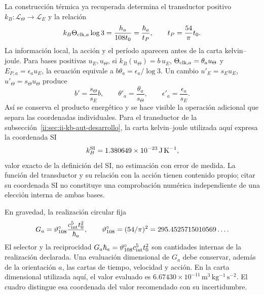 La construcción térmica ya recuperada determina el transductor positivo
\(k_B:\mathcal L_\Theta\to\mathcal L_E\) y la relación
\begin{equation}
 k_B\Theta_{{\rm clk},a}\log3
 =\frac{h_a}{108t_0}=\frac{\hbar_a}{t_P},
 \qquad t_P=\frac{54}{\pi}t_0.
 \label{ii:eq:ii-kb-comparacion}
\end{equation}
La información local, la acción y el período aparecen antes de la carta
kelvin--joule. Para bases positivas \(u_E,u_\Theta\), si
\(k_B(u_\Theta)=b\,u_E\),
\(\Theta_{{\rm clk},a}=\theta_a u_\Theta\) y
\(E_{P,a}=\epsilon_a u_E\), la ecuación equivale a
\(b\theta_a=\epsilon_a/\log3\). Un cambio
\(u'_E=s_Eu_E\), \(u'_\Theta=s_\Theta u_\Theta\) produce
\[
 b'=\frac{s_\Theta}{s_E}b,\qquad
 \theta'_a=\frac{\theta_a}{s_\Theta},\qquad
 \epsilon'_a=\frac{\epsilon_a}{s_E}.
\]
Así se conserva el producto energético y se hace visible la operación
adicional que separa las coordenadas individuales. Para el transductor
de la subsección~\ref{ii:sec:ii-kb-aut-desarrollo}, la carta kelvin--joule
utilizada aquí expresa la coordenada SI
\[
 k_B^{\rm SI}=1.380649\times10^{-23}\,\mathrm{J\,K^{-1}},
\]
valor exacto de la definición del SI, no estimación con error de medida.
La función del transductor y su relación con la acción tienen contenido
propio; citar su coordenada SI no constituye una comprobación numérica
independiente de una elección interna de ambas bases.

En gravedad, la realización circular fija
\begin{equation}
 G_a=\vartheta_{108}^{\circ}\frac{c_{\rm int}^{5}t_0^2}{\hbar_a},
 \qquad
 \vartheta_{108}^{\circ}=(54/\pi)^2
 =295.4525715010569\ldots.
 \label{ii:eq:ii-g-comparacion}
\end{equation}
El selector y la reciprocidad \(G_a\hbar_a=
\vartheta_{108}^{\circ}c_{\rm int}^{5}t_0^2\) son cantidades internas de
la realización declarada. Una evaluación dimensional de \(G_a\) debe
conservar, además de la orientación \(a\), las cartas de tiempo,
velocidad y acción. En la carta dimensional utilizada aquí, el valor evaluado es
\(6.67430\times10^{-11}\,\mathrm{m^3\,kg^{-1}\,s^{-2}}\).
El cuadro distingue esa coordenada del
valor recomendado con su incertidumbre.


